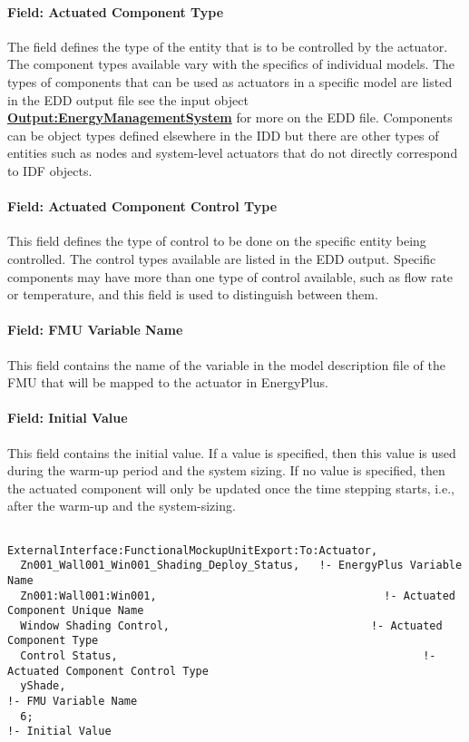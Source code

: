 \paragraph{Field: Actuated Component Type}\label{field-actuated-component-type-2}

The field defines the type of the entity that is to be controlled by the actuator. The component types available vary with the specifics of individual models. The types of components that can be used as actuators in a specific model are listed in the EDD output file see the input object \textbf{\hyperref[outputenergymanagementsystem]{Output:EnergyManagementSystem}} for more on the EDD file. Components can be object types defined elsewhere in the IDD but there are other types of entities such as nodes and system-level actuators that do not directly correspond to IDF objects.

\paragraph{Field: Actuated Component Control Type}\label{field-actuated-component-control-type-2}

This field defines the type of control to be done on the specific entity being controlled. The control types available are listed in the EDD output. Specific components may have more than one type of control available, such as flow rate or temperature, and this field is used to distinguish between them.

\paragraph{Field: FMU Variable Name}\label{field-fmu-variable-name-6}

This field contains the name of the variable in the model description file of the FMU that will be mapped to the actuator in EnergyPlus.

\paragraph{Field: Initial Value}\label{field-initial-value-7}

This field contains the initial value. If a value is specified, then this value is used during the warm-up period and the system sizing. If no value is specified, then the actuated component will only be updated once the time stepping starts, i.e., after the warm-up and the system-sizing.

\begin{lstlisting}

ExternalInterface:FunctionalMockupUnitExport:To:Actuator,
  Zn001_Wall001_Win001_Shading_Deploy_Status,   !- EnergyPlus Variable Name
  Zn001:Wall001:Win001,                                   !- Actuated Component Unique Name
  Window Shading Control,                               !- Actuated Component Type
  Control Status,                                               !- Actuated Component Control Type
  yShade,                                                               !- FMU Variable Name
  6;                                                                         !- Initial Value
\end{lstlisting}

